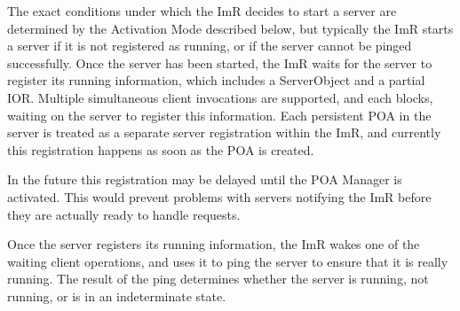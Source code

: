 The exact conditions under which the ImR decides to start a server are
determined by the Activation Mode described below, but typically the
ImR starts a server if it is not registered as running, or if the server cannot
be pinged successfully. Once the server has been started, the ImR waits
for the server to register its running information, which includes a
ServerObject and a partial IOR. Multiple simultaneous client invocations
are supported, and each blocks, waiting on the server to register this
information. Each persistent POA in the server is treated as a separate
server registration within the ImR, and currently this registration happens
as soon as the POA is created.

In the future this registration may be delayed until the POA Manager
is activated. This would prevent problems with servers notifying the ImR
before they are actually ready to handle requests.

Once the server registers its running information, the ImR wakes one of
the waiting client operations, and uses it to ping the server to ensure that
it is really running. The result of the ping determines whether the server
is running, not running, or is in an indeterminate state.

